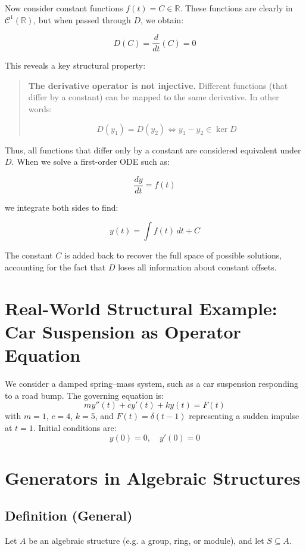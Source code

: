 \documentclass[12pt]{article}
\begin{document}
	Now consider constant functions $f(t) = C \in \mathbb{R}$. These functions are clearly in $\mathcal{C}^1(\mathbb{R})$, but when passed through $D$, we obtain:
	
	$$
	D(C) = \frac{d}{dt}(C) = 0
	$$
	
	This reveals a key structural property:
	
	\begin{quote}
		\textbf{The derivative operator is not injective.} Different functions (that differ by a constant) can be mapped to the same derivative. In other words:
		
		$$
		D(y_1) = D(y_2) \iff y_1 - y_2 \in \ker D
		$$
		
	\end{quote}
	
	Thus, all functions that differ only by a constant are considered equivalent under $D$. When we solve a first-order ODE such as:
	
	$$
	\frac{dy}{dt} = f(t)
	$$
	
	we integrate both sides to find:
	
	$$
	y(t) = \int f(t)\,dt + C
	$$
	
	The constant $C$ is added back to recover the full space of possible solutions, accounting for the fact that $D$ loses all information about constant offsets.
	
	\section*{Real-World Structural Example: Car Suspension as Operator Equation}
	
	We consider a damped spring–mass system, such as a car suspension responding to a road bump. The governing equation is:
	\[
	m y''(t) + c y'(t) + k y(t) = F(t)
	\]
	with $m = 1$, $c = 4$, $k = 5$, and $F(t) = \delta(t - 1)$ representing a sudden impulse at $t = 1$. Initial conditions are:
	\[
	y(0) = 0, \quad y'(0) = 0
	\]
	
	\section*{Generators in Algebraic Structures}
	
	\subsection*{Definition (General)}
	
	Let $A$ be an algebraic structure (e.g. a group, ring, or module), and let $S \subseteq A$.
	
\end{document}
